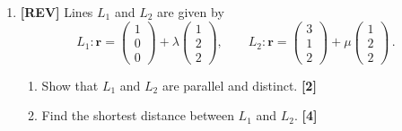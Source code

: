 \documentclass[11pt,a4paper]{article}
\begin{document}
\begin{enumerate}[resume]
\item \textbf{[REV]} Lines $L_1$ and $L_2$ are given by
\[
L_1 : \mathbf{r} = \begin{pmatrix} 1 \\ 0 \\ 0 \end{pmatrix} + \lambda\begin{pmatrix} 1 \\ 2 \\ 2 \end{pmatrix},
\qquad
L_2 : \mathbf{r} = \begin{pmatrix} 3 \\ 1 \\ 2 \end{pmatrix} + \mu\begin{pmatrix} 1 \\ 2 \\ 2 \end{pmatrix}\,.
\]
\begin{enumerate}
  \item Show that $L_1$ and $L_2$ are parallel and distinct. \hfill{\small\textbf{[2]}}
  \item Find the shortest distance between $L_1$ and $L_2$. \hfill{\small\textbf{[4]}}
\end{enumerate}

\end{enumerate}

\newpage
\end{document}
